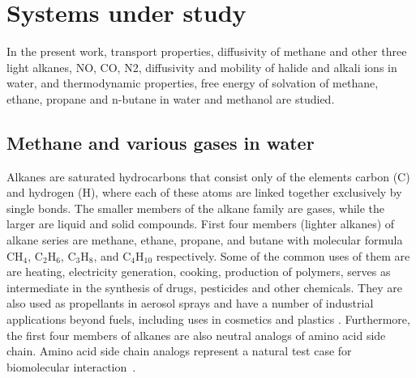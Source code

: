 \section{Systems under study}
In the present work, transport properties, diffusivity of methane and other three light alkanes, NO, CO, N2,  diffusivity and mobility of halide and alkali ions in water, and thermodynamic properties, free energy of solvation of methane, ethane, propane and n-butane in water and methanol  are studied.
\subsection{Methane and various gases in water} \label{methane_diffusion}
\begin{sloppypar}
Alkanes are saturated hydrocarbons that consist only of the elements carbon (C) and hydrogen (H), where each of these atoms are linked together exclusively by single bonds. The smaller members of the alkane family are gases, while the larger are liquid and solid compounds. First four members (lighter alkanes) of alkane series are methane, ethane, propane, and butane with molecular formula $\mathrm{CH_4}$, $\mathrm{C_2H_6}$, $\mathrm{C_3H_8}$, and $\mathrm{C_4H_{10}}$ respectively. Some of the common uses of them are are heating, electricity generation, cooking, production of polymers, serves as intermediate in the synthesis of drugs, pesticides and other chemicals. They are also used as propellants in aerosol sprays and   have a number of industrial applications beyond fuels, including uses in cosmetics and plastics \citep{morrison2011, brown2014introduction}. Furthermore, the first four members of alkanes are also neutral analogs of amino acid side chain. Amino acid side chain analogs represent a natural test case for biomolecular interaction~\citep{shirts2003extremely, shirts2005solvation}.
\end{sloppypar}

